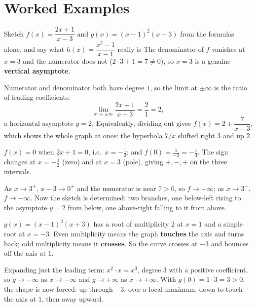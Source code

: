 \section{Worked Examples}

\begin{worked}{Sketch $f(x)=\dfrac{2x+1}{x-3}$ and $g(x)=(x-1)^{2}(x+3)$ from the formulas alone, and say what $h(x)=\dfrac{x^{2}-1}{x-1}$ really is}
The denominator of $f$ vanishes at $x=3$ and the numerator does not
($2\cdot3+1=7\neq0$), so $x=3$ is a genuine \textbf{vertical asymptote}.

Numerator and denominator both have degree $1$, so the limit at $\pm\infty$
is the ratio of leading coefficients:
\[
  \lim_{x\to\pm\infty}\frac{2x+1}{x-3}=\frac{2}{1}=2 ,
\]
a horizontal asymptote $y=2$. Equivalently, dividing out gives
$f(x)=2+\dfrac{7}{x-3}$, which shows the whole graph at once: the hyperbola
$7/x$ shifted right $3$ and up $2$.

$f(x)=0$ when $2x+1=0$, i.e.\ $x=-\tfrac12$; and $f(0)=\tfrac{1}{-3}=-\tfrac13$.
The sign changes at $x=-\tfrac12$ (zero) and at $x=3$ (pole), giving
$+,-,+$ on the three intervals.

As $x\to3^{+}$, $x-3\to0^{+}$ and the numerator is near $7>0$, so
$f\to+\infty$; as $x\to3^{-}$, $f\to-\infty$. Now the sketch is determined:
two branches, one below-left rising to the asymptote $y=2$ from below, one
above-right falling to it from above.

$g(x)=(x-1)^{2}(x+3)$ has a root of multiplicity $2$ at $x=1$ and a simple
root at $x=-3$. Even multiplicity means the graph \textbf{touches} the axis
and turns back; odd multiplicity means it \textbf{crosses}. So the curve
crosses at $-3$ and bounces off the axis at $1$.

Expanding just the leading term: $x^{2}\cdot x=x^{3}$, degree $3$ with a
positive coefficient, so $g\to-\infty$ as $x\to-\infty$ and $g\to+\infty$ as
$x\to+\infty$. With $g(0)=1\cdot3=3>0$, the shape is now forced: up through
$-3$, over a local maximum, down to touch the axis at $1$, then away
upward.


\end{worked}
